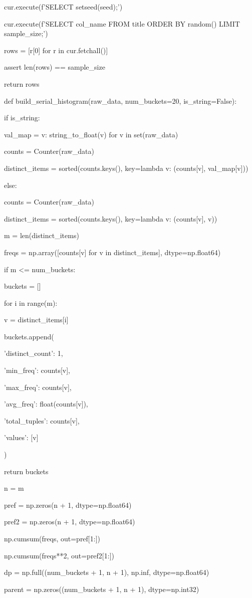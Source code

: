 \documentclass[11pt,a4paper]{article}
\begin{document}
cur.execute(f'SELECT setseed({seed});')

cur.execute(f'SELECT {col\_name} FROM title ORDER BY random() LIMIT {sample\_size};')

rows = [r[0] for r in cur.fetchall()]

assert len(rows) == sample\_size

return rows


def build\_serial\_histogram(raw\_data, num\_buckets=20, is\_string=False):

if is\_string:

val\_map = {v: string\_to\_float(v) for v in set(raw\_data)}

counts = Counter(raw\_data)

distinct\_items = sorted(counts.keys(), key=lambda v: (counts[v], val\_map[v]))

else:

counts = Counter(raw\_data)

distinct\_items = sorted(counts.keys(), key=lambda v: (counts[v], v))


m = len(distinct\_items)

freqs = np.array([counts[v] for v in distinct\_items], dtype=np.float64)


if m <= num\_buckets:

buckets = []

for i in range(m):

v = distinct\_items[i]

buckets.append({

'distinct\_count': 1,

'min\_freq': counts[v],

'max\_freq': counts[v],

'avg\_freq': float(counts[v]),

'total\_tuples': counts[v],

'values': [v]

})

return buckets


n = m

pref = np.zeros(n + 1, dtype=np.float64)

pref2 = np.zeros(n + 1, dtype=np.float64)

np.cumsum(freqs, out=pref[1:])

np.cumsum(freqs**2, out=pref2[1:])


dp = np.full((num\_buckets + 1, n + 1), np.inf, dtype=np.float64)

parent = np.zeros((num\_buckets + 1, n + 1), dtype=np.int32)
\end{document}
